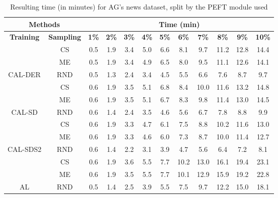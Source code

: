\begin{table}[htbp]
\begin{subtable}{\linewidth}
\begin{tabular}{c|c|cccccccccc}
\toprule
\multicolumn{2}{c|}{\textbf{Methods}} & \multicolumn{10}{c}{\textbf{Time (min)}} \\
\midrule
\textbf{Training} & \textbf{Sampling} & \textbf{1\%} & \textbf{2\%} & \textbf{3\%} & \textbf{4\%} & \textbf{5\%} & \textbf{6\%} & \textbf{7\%} & \textbf{8\%} & \textbf{9\%} & \textbf{10\%}\\
\midrule
 & CS & 0.5 & 1.9 & 3.4 & 5.0 & 6.6 & 8.1 & 9.7 & 11.2 & 12.8 & 14.4\\

 & ME & 0.5 & 1.9 & 3.4 & 4.9 & 6.5 & 8.0 & 9.5 & 11.1 & 12.6 & 14.1\\

\multirow{-3}{*}{\raggedright\arraybackslash CAL-DER} & RND & 0.5 & 1.3 & 2.4 & 3.4 & 4.5 & 5.5 & 6.6 & 7.6 & 8.7 & 9.7\\
\midrule
 & CS & 0.6 & 1.9 & 3.5 & 5.1 & 6.8 & 8.4 & 10.0 & 11.6 & 13.2 & 14.8\\

 & ME & 0.6 & 1.9 & 3.5 & 5.1 & 6.7 & 8.3 & 9.8 & 11.4 & 13.0 & 14.5\\

\multirow{-3}{*}{\raggedright\arraybackslash CAL-SD} & RND & 0.6 & 1.4 & 2.4 & 3.5 & 4.6 & 5.6 & 6.7 & 7.8 & 8.8 & 9.9\\
\midrule
 & CS & 0.6 & 1.9 & 3.3 & 4.7 & 6.1 & 7.5 & 8.8 & 10.2 & 11.6 & 13.0\\

 & ME & 0.6 & 1.9 & 3.3 & 4.6 & 6.0 & 7.3 & 8.7 & 10.0 & 11.4 & 12.7\\

\multirow{-3}{*}{\raggedright\arraybackslash CAL-SDS2} & RND & 0.6 & 1.4 & 2.2 & 3.1 & 3.9 & 4.7 & 5.6 & 6.4 & 7.2 & 8.1\\
\midrule
 & CS & 0.6 & 1.9 & 3.6 & 5.5 & 7.7 & 10.2 & 13.0 & 16.1 & 19.4 & 23.1\\

 & ME & 0.6 & 1.9 & 3.5 & 5.5 & 7.7 & 10.1 & 12.9 & 15.9 & 19.2 & 22.8\\

\multirow{-3}{*}{\raggedright\arraybackslash AL} & RND & 0.5 & 1.4 & 2.5 & 3.9 & 5.5 & 7.5 & 9.7 & 12.2 & 15.0 & 18.1\\
\bottomrule
\end{tabular}
\end{subtable}
\caption{Resulting time (in minutes) for AG's news dataset, split by the PEFT module used}
\label{tab:time_short_agnews_10}
\end{table}
